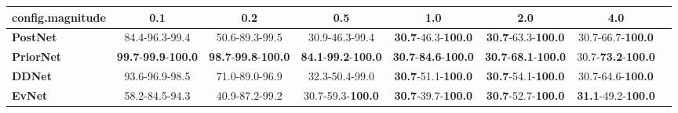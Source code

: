 \begin{tabular}{lccccccc}
\toprule
\textbf{config.magnitude} &                                         0.1 &                                         0.2 &                                         0.5 &                                         1.0 &                                         2.0 &                                4.0 \\
\midrule
\textbf{PostNet } &                              84.4-96.3-99.4 &                              50.6-89.3-99.5 &                              30.9-46.3-99.4 &           \textbf{30.7}-46.3-\textbf{100.0} &           \textbf{30.7}-63.3-\textbf{100.0} &           30.7-66.7-\textbf{100.0} \\
\textbf{PriorNet} &  \textbf{99.7}-\textbf{99.9}-\textbf{100.0} &  \textbf{98.7}-\textbf{99.8}-\textbf{100.0} &  \textbf{84.1}-\textbf{99.2}-\textbf{100.0} &  \textbf{30.7}-\textbf{84.6}-\textbf{100.0} &  \textbf{30.7}-\textbf{68.1}-\textbf{100.0} &  30.7-\textbf{73.2}-\textbf{100.0} \\
\textbf{DDNet   } &                              93.6-96.9-98.5 &                              71.0-89.0-96.9 &                              32.3-50.4-99.0 &           \textbf{30.7}-51.1-\textbf{100.0} &           \textbf{30.7}-54.1-\textbf{100.0} &           30.7-64.6-\textbf{100.0} \\
\textbf{EvNet   } &                              58.2-84.5-94.3 &                              40.9-87.2-99.2 &                    30.7-59.3-\textbf{100.0} &           \textbf{30.7}-39.7-\textbf{100.0} &           \textbf{30.7}-52.7-\textbf{100.0} &  \textbf{31.1}-49.2-\textbf{100.0} \\
\bottomrule
\end{tabular}
